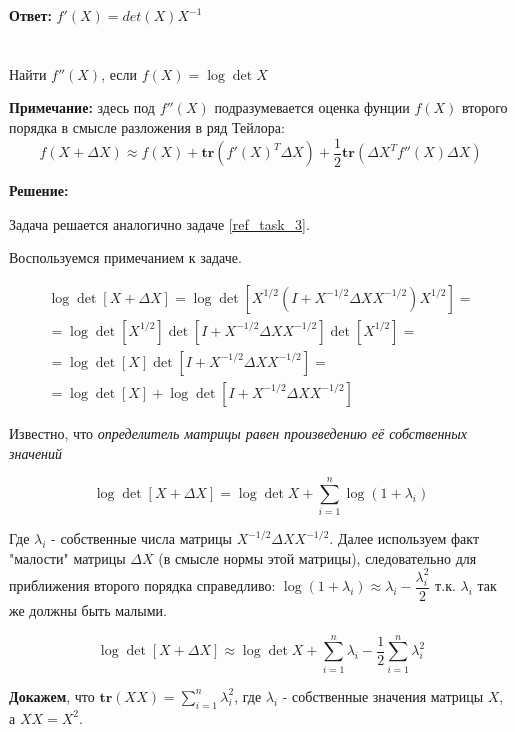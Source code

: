 \documentclass[a4paper,12pt]{article}
\newcommand{\fr}{\frac}
\newcommand{\dfr}{\dfrac}
\begin{document}
\textbf{Ответ:} $f'(X) = det(X) X^{-1}$

\section{}

Найти $f''(X)$, если $f(X) = \log \det X$

{\bf Примечание:} здесь под $f''(X)$ подразумевается оценка фунции $f(X)$ второго порядка в смысле разложения в ряд Тейлора:
     $$f(X + \Delta X) \approx f(X) + \mathbf{tr}(f'(X)^T \Delta X) + \frac{1}{2}\mathbf{tr}(\Delta X^T f''(X) \Delta X)$$

\vspace{\baselineskip}

\textbf{Решение:}

\vspace{\baselineskip}

Задача решается аналогично задаче \ref{ref_task_3}.

Воспользуемся примечанием к задаче.

\begin{multline}
\log\det\left[ X+ \Delta X\right] = \log \det \left[ X^{1/2} \left(I + X^{-1/2} \Delta X X^{-1/2}\right)X^{1/2}\right] =\\= \log \det \left[ X^{1/2} \right]\det \left[ I + X^{-1/2} \Delta X X^{-1/2}\right] \det \left[ X^{1/2}\right] =\\= \log \det \left[ X \right]\det \left[ I + X^{-1/2} \Delta X X^{-1/2}\right]=\\= \log \det \left[ X \right] + \log\det \left[ I + X^{-1/2} \Delta X X^{-1/2}\right]
\end{multline}

Известно, что {\it определитель матрицы равен произведению её собственных значений}

$$\log\det\left[ X+ \Delta X\right] = \log\det X + \sum\limits_{i=1}^n \log(1 + \lambda_i)$$

Где $\lambda_i$ - собственные числа матрицы $X^{-1/2} \Delta X X^{-1/2}$. Далее используем факт "малости" матрицы $\Delta X$ (в смысле нормы этой матрицы), следовательно для приближения второго порядка справедливо: $\log (1 + \lambda_i) \approx \lambda_i - \dfr{\lambda_i^2}{2}$ т.к. $\lambda_i$ так же должны быть малыми.

$$\log\det\left[ X+ \Delta X\right] \approx \log\det X + \sum\limits_{i=1}^n \lambda_i - \fr{1}{2}\sum\limits_{i=1}^n \lambda_i^2$$

{\bf Докажем}, что $\mathbf{tr}(XX) = \sum\limits_{i=1}^n \lambda_i^2$, где $\lambda_i$ - собственные значения матрицы $X$, а $XX = X^2$.
\end{document}
